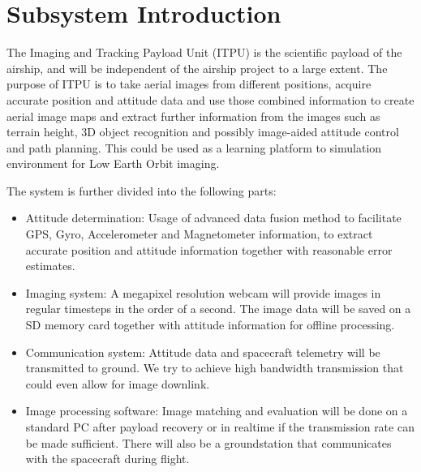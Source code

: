 \documentclass[fontsize=11pt,paper=a4,]{scrartcl}
\begin{document}
\sloppy



\pagestyle{plain}



\listoffigures
\newpage

\listoftables
\newpage

\tableofcontents
\newpage
\acresetall	%
\clearpage %
\pagestyle{fancy}




\section{Subsystem Introduction}
The Imaging and Tracking Payload Unit (ITPU) is the scientific payload of the airship, and will be independent of the airship project to a large extent.
The purpose of ITPU is to take aerial images from different positions, acquire accurate position and attitude data and use those combined information to create aerial image maps and extract further information from the images such as terrain height, 3D object recognition and possibly image-aided attitude control and path planning.
This could be used as a learning platform to simulation environment for Low Earth Orbit imaging.

The system is further divided into the following parts:
\begin{itemize}
\item Attitude determination: Usage of advanced data fusion method to facilitate GPS, Gyro, Accelerometer and Magnetometer information, to extract accurate position and attitude information together with reasonable error estimates.
\item Imaging system: A megapixel resolution webcam will provide images in regular timesteps in the order of a second.
The image data will be saved on a SD memory card together with attitude information for offline processing.
\item Communication system: Attitude data and spacecraft telemetry will be transmitted to ground.
We try to achieve high bandwidth transmission that could even allow for image downlink.
\item Image processing software:
Image matching and evaluation will be done on a standard PC after payload recovery or in realtime if the transmission rate can be made sufficient.
There will also be a groundstation that communicates with the spacecraft during flight.
\end{itemize}
\end{document}
